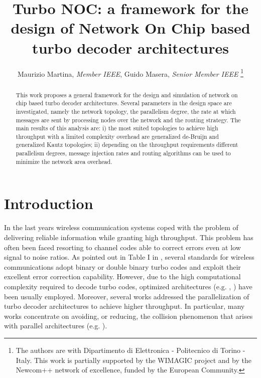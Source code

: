 \documentclass[10pt,twocolumn,journal]{IEEEtran}
\title{Turbo NOC: a framework for the design of Network On Chip based turbo decoder architectures}
\author{Maurizio Martina, \emph{Member IEEE}, Guido Masera, \emph{Senior Member IEEE} 
\thanks{The authors are with 
Dipartimento di Elettronica - Politecnico di Torino - Italy. This work is partially supported by the WIMAGIC project and 
by the Newcom++ network of excellence, funded by the European Community.}}
\begin{document}
\maketitle

\begin{abstract}
This work proposes a general framework for the design and simulation of 
network on chip based turbo decoder architectures. 
Several parameters in the design space are investigated, namely the 
network topology, the parallelism degree, the rate at which messages are sent by processing nodes 
over the network and the routing strategy. 
The main results of this analysis are: i) the most suited topologies 
to achieve high throughput with a limited complexity overhead 
are generalized de-Bruijn and generalized Kautz topologies; 
ii) depending on the throughput requirements different parallelism degrees, message injection rates and routing algorithms can be used to minimize the network area overhead.
\end{abstract}



\section{Introduction}
\label{sec:intro}

In the last years wireless communication systems coped with the problem of delivering reliable information while 
granting high throughput. This problem has often been faced resorting to channel codes able to correct errors even at low signal to noise ratios. 
As pointed out in Table I in \cite{wehn_TVLSI08}, several standards for wireless communications adopt binary 
or double binary turbo codes \cite{berrou_ICC93, berrou_ITW01} and exploit their excellent error correction capability. 
However, due to the high computational complexity required to decode turbo codes, optimized architectures  
(e.g. \cite{dobkin_TVLSI05}, \cite{martina_TCASII08}) have been usually employed. Moreover, several works addressed the parallelization of turbo decoder architectures to achieve higher throughput. 
In particular, many works concentrate on 
avoiding, or reducing, the collision phenomenon that arises with parallel architectures 
(e.g. \cite{giulietti_EL02, lee_EL02, wehn_ISCAS02, tarable_CL04}).
\end{document}
